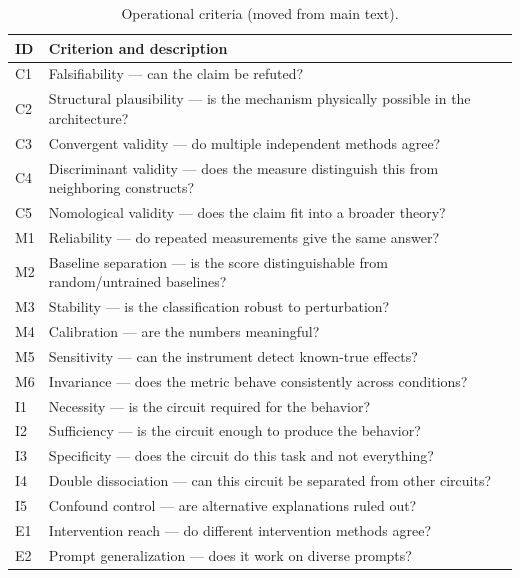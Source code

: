 \documentclass[10pt]{article}
\begin{document}
\begingroup
{}
\begin{table}[p]
\centering
\small
\caption{Operational criteria (moved from main text).}
\label{tab:criteria_app}
\renewcommand{\arraystretch}{1.08}
\begin{tabular}{|l|p{}|}
\hline
\textbf{ID} & \textbf{Criterion and description} \\
\hline
C1 & Falsifiability --- can the claim be refuted? \\
\hline
C2 & Structural plausibility --- is the mechanism physically possible in the architecture? \\
\hline
C3 & Convergent validity --- do multiple independent methods agree? \\
\hline
C4 & Discriminant validity --- does the measure distinguish this from neighboring constructs? \\
\hline
C5 & Nomological validity --- does the claim fit into a broader theory? \\
\hline
M1 & Reliability --- do repeated measurements give the same answer? \\
\hline
M2 & Baseline separation --- is the score distinguishable from random/untrained baselines? \\
\hline
M3 & Stability --- is the classification robust to perturbation? \\
\hline
M4 & Calibration --- are the numbers meaningful? \\
\hline
M5 & Sensitivity --- can the instrument detect known-true effects? \\
\hline
M6 & Invariance --- does the metric behave consistently across conditions? \\
\hline
I1 & Necessity --- is the circuit required for the behavior? \\
\hline
I2 & Sufficiency --- is the circuit enough to produce the behavior? \\
\hline
I3 & Specificity --- does the circuit do this task and not everything? \\
\hline
I4 & Double dissociation --- can this circuit be separated from other circuits? \\
\hline
I5 & Confound control --- are alternative explanations ruled out? \\
\hline
E1 & Intervention reach --- do different intervention methods agree? \\
\hline
E2 & Prompt generalization --- does it work on diverse prompts? \\

\end{tabular}
\end{table}
\end{document}
